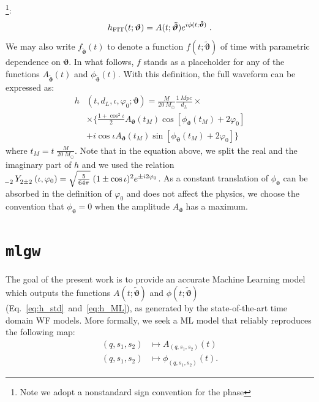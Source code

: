 \footnote{Note we adopt a nonstandard sign convention for the phase}:
\begin{equation} \label{eq:h_ML}
	h_{\rm FIT}(t; \boldsymbol{\vartheta}) = A(t; \boldsymbol{\tilde{\vartheta}}) e^{i \phi(t; \boldsymbol{\tilde{\vartheta}})} \; . 
\end{equation}
We may also write $f_{\boldsymbol{\tilde{\vartheta}}}(t)$ to denote a 
function $f(t;\boldsymbol{\tilde{\vartheta}})$ of time with parametric dependence on $\boldsymbol{\vartheta}$.
In what follows, $f$ stands as a placeholder for any of the functions $A_{\tilde{\boldsymbol{\vartheta}}}(t)$ 
and ${\phi}_{\tilde{\boldsymbol{\vartheta}}}(t)$.
With this definition, the full waveform can be expressed as:
\begin{align} 
	h&(t, d_L,\iota,\varphi_0; \boldsymbol{\vartheta}) = \frac{M}{\SI{20}{M_\odot}} \frac{\SI{1}{Mpc}}{d_L} \times  \nonumber \\
		&\times \Bigg\{ \frac{1+\cos^2\iota}{2} A_{\boldsymbol{\vartheta}}(t_M)  \cos[\phi_{\boldsymbol{\vartheta}}(t_M)+2\varphi_0]  \nonumber \\
		&+ i \cos\iota A_{\boldsymbol{\vartheta}}(t_M)
 \sin[\phi_{\boldsymbol{\vartheta}}(t_M)+2\varphi_0] \Bigg\}
\label{eq:h_parametrization_simple}
\end{align}
where $t_M = t \; \frac{M}{\SI{20}{M_\odot}}$.
Note that in the equation above, we split the real and the imaginary part of $h$ and we 
used the relation ${\tensor[_{-2}]{Y}{_{2 \pm 2}}(\iota, \varphi_0) = \sqrt{\frac{5}{64\pi}} \; (1 \pm \cos \iota)^2 e^{\pm i 2 \varphi_0}}$.
As a constant translation of $\phi_{\boldsymbol{\vartheta}}$ can be absorbed in the definition of $\varphi_0$ and does not affect the physics, we choose the convention that $\phi_{\boldsymbol{\vartheta}} = 0$ when the amplitude $A_{\boldsymbol{\vartheta}}$ 
has a maximum.

\section{\lowercase{\texttt{mlgw}}}
\label{sec:model}
%
The goal of the present work is to provide an accurate Machine Learning model which outputs the functions $A(t;\boldsymbol{\tilde{\vartheta}})$ and $\phi(t;\boldsymbol{\tilde{\vartheta}})$ (Eq.~\eqref{eq:h_std}~and~\eqref{eq:h_ML}), as generated by the state-of-the-art time domain WF models.
More formally, we seek a ML model that reliably reproduces the following map:
\begin{align}
	(q, s_1, s_2) &\longmapsto A_{(q, s_1, s_2)}(t) \label{eq:objective_amp}\\
	(q, s_1, s_2) &\longmapsto \phi_{(q, s_1, s_2)}(t) . \label{eq:objective_ph}
\end{align}

